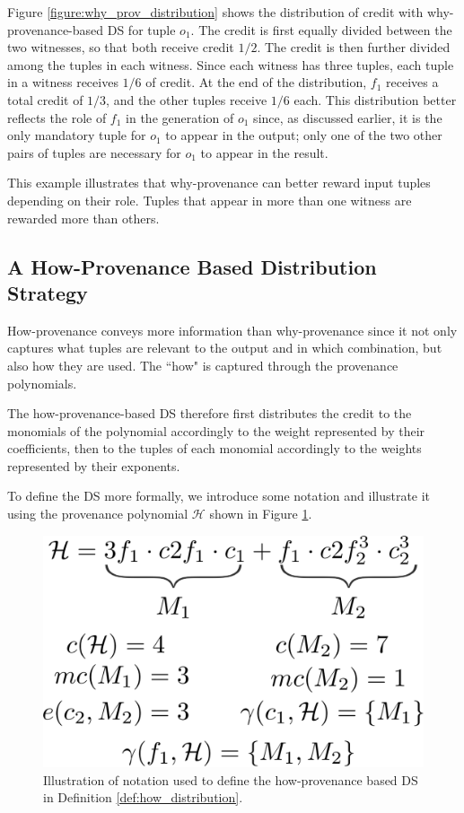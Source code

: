 Figure \ref{figure:why_prov_distribution} shows the distribution of credit with why-provenance-based DS for tuple $o_1$.
The credit is first equally divided between the two witnesses, so that both receive credit $1/2$. 
The credit is then further divided among the tuples in each witness. Since each witness has three tuples, each tuple in a witness receives $1/6$ of credit. At the end of the distribution, $f_1$ receives a total credit of $1/3$, and the other tuples receive $1/6$ each.
This distribution better reflects the role of $f_1$ in the generation of $o_1$ since, as discussed earlier, it is the only mandatory tuple for $o_1$ to appear in the output; only one of the two other pairs of tuples are necessary for $o_1$ to appear in the result. 

This example illustrates that why-provenance can better reward input tuples depending on their role. Tuples that appear in more than one witness are rewarded more than others. 

\subsection{A How-Provenance Based Distribution Strategy}
\label{section:how_prov_distr_tuples}


How-provenance conveys more information than why-provenance since it not only captures what tuples are relevant to the output and in which combination, but also how they are used. The ``how" is captured through the provenance polynomials.

The how-provenance-based DS therefore first distributes the credit to the monomials of the polynomial accordingly to the weight represented by their coefficients, then to the tuples of each monomial accordingly to the weights represented by their exponents. 

To define the DS more formally, we introduce some notation and illustrate it using the provenance polynomial $\mathcal{H}$ shown in Figure \ref{figure:how_example}. 


\begin{figure}[]
\centering
  \includegraphics[width=.4\textwidth]{figures/how_example}
  \caption{Illustration of notation used to define the how-provenance based DS in Definition \ref{def:how_distribution}.}
  \label{figure:how_example}
\end{figure}

